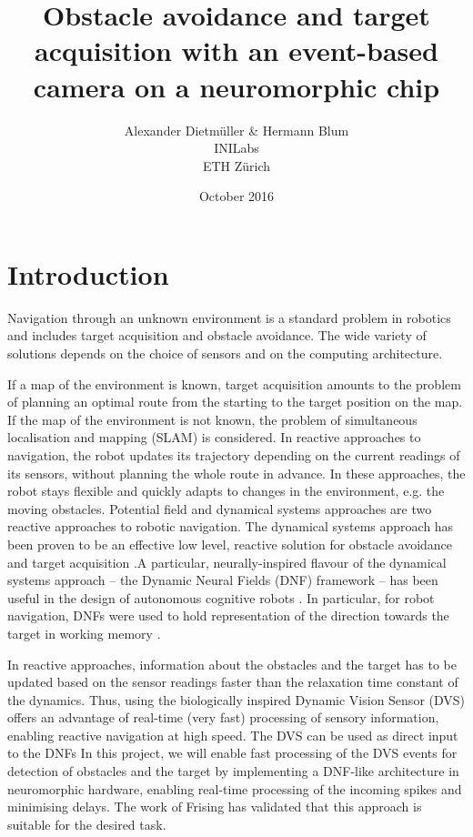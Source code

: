 \documentclass[a4paper, twocolumn]{article}
\title{Obstacle avoidance and target acquisition with an event-based camera on a neuromorphic chip}
\author{Alexander Dietmüller \& Hermann Blum \\INILabs\\ETH Zürich}
\date{October 2016}
\begin{document}
\maketitle

\section*{Introduction}
Navigation through an unknown environment is a standard problem in robotics and includes target acquisition and obstacle avoidance. The wide variety of solutions depends on the choice of sensors and on the computing architecture. 

If a map of the environment is known, target acquisition amounts to the problem of planning an optimal route from the starting to the target position on the map. If the map of the environment is not known, the problem of simultaneous localisation and mapping (SLAM) is considered.  In reactive approaches to navigation, the robot updates its trajectory depending on the current readings of its sensors, without planning the whole route in advance. In these approaches, the robot stays flexible and quickly adapts to changes in the environment, e.g. the moving obstacles.  Potential field and dynamical systems approaches are two reactive approaches to robotic navigation. The dynamical systems approach has been proven to be an effective low level, reactive solution for obstacle avoidance and target acquisition \cite{bicho1998}.A particular, neurally-inspired flavour of the dynamical systems approach -- the Dynamic Neural Fields (DNF) framework -- has been useful in the design of autonomous cognitive robots \cite{erlhagen2006}. In particular, for robot navigation, DNFs were used to hold representation of the direction towards the target in working memory \cite{bicho2000}.
 
In reactive approaches, information about the obstacles and the target has to be updated based on the sensor readings faster than the relaxation time constant of the dynamics. Thus, using  the biologically inspired Dynamic Vision Sensor (DVS) \cite{lichtsteiner2008} offers an advantage of real-time (very fast) processing of sensory information, enabling reactive navigation at high speed. The DVS can be used as direct input to the DNFs \cite{sandamirskayaconradt2013} In this project, we will enable fast processing of the DVS events for detection of obstacles and the target by implementing a DNF-like architecture in neuromorphic hardware, enabling real-time processing of the incoming spikes and minimising delays. The work of Frising \cite{frising} has validated that this approach is suitable for the desired task.
\end{document}

